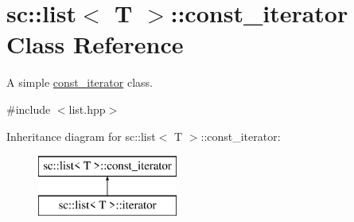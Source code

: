 \hypertarget{classsc_1_1list_1_1const__iterator}{}\section{sc\+:\+:list$<$ T $>$\+:\+:const\+\_\+iterator Class Reference}
\label{classsc_1_1list_1_1const__iterator}


A simple \mbox{\hyperlink{classsc_1_1list_1_1const__iterator}{const\+\_\+iterator}} class.  




{\ttfamily \#include $<$list.\+hpp$>$}

Inheritance diagram for sc\+:\+:list$<$ T $>$\+:\+:const\+\_\+iterator\+:\begin{figure}[H]
\begin{center}
\leavevmode
\includegraphics[height=2.000000cm]{classsc_1_1list_1_1const__iterator}
\end{center}
\end{figure}
